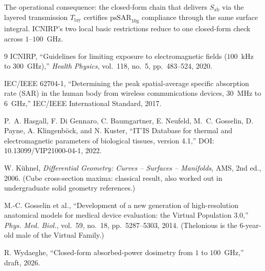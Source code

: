 \documentclass[11pt,a4paper]{article}
\theoremstyle{definition}
\theoremstyle{remark}
\newcommand{\APD}{S_{\mathrm{ab}}}
\newcommand{\Tlay}{T_{\mathrm{lay}}}
\newcommand{\psSAR}{\ensuremath{\mathrm{psSAR}_{10\mathrm{g}}}}
\begin{document}
The operational consequence: the closed-form chain that delivers
$\APD$ via the layered transmission $\Tlay$ certifies $\psSAR$
compliance through the same surface integral. ICNIRP's two local
basic restrictions reduce to one closed-form check across $1$--$100$~GHz.


\begin{thebibliography}{9}
ICNIRP, ``Guidelines for limiting exposure to electromagnetic fields
($100$~kHz to $300$~GHz),'' \emph{Health Physics}, vol.~118, no.~5,
pp.~483--524, 2020.

IEC/IEEE 62704-1, ``Determining the peak spatial-average specific
absorption rate (SAR) in the human body from wireless communications
devices, $30$~MHz to $6$~GHz,'' IEC/IEEE International Standard, 2017.

P.~A. Hasgall, F. Di Gennaro, C. Baumgartner, E. Neufeld, M.~C. Gosselin,
D. Payne, A. Klingenb\"ock, and N. Kuster, ``IT'IS Database for thermal
and electromagnetic parameters of biological tissues, version 4.1,''
DOI: 10.13099/VIP21000-04-1, 2022.

W. K\"uhnel, \emph{Differential Geometry: Curves -- Surfaces --
Manifolds}, AMS, 2nd ed., 2006. (Cube cross-section maxima: classical
result, also worked out in undergraduate solid geometry references.)

M.-C. Gosselin et al., ``Development of a new generation of high-resolution
anatomical models for medical device evaluation: the Virtual Population
3.0,'' \emph{Phys. Med. Biol.}, vol.~59, no.~18, pp.~5287--5303, 2014.
(Thelonious is the 6-year-old male of the Virtual Family.)

R. Wydaeghe, ``Closed-form absorbed-power dosimetry from $1$ to
$100$~GHz,'' draft, 2026.

\end{thebibliography}
\end{document}
